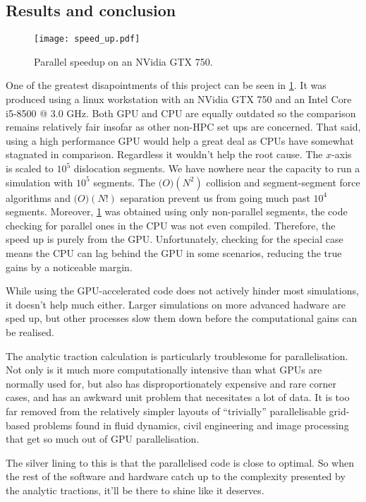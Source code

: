 \subsection{Results and conclusion}

\begin{figure}
    \centering
    \texttt{[image: speed\_up.pdf]}
    \caption[Parallel speedup on an NVidia GTX 750.]{Parallel speedup on an NVidia GTX 750.}
    \label{fig:parallel}
\end{figure}

One of the greatest disapointments of this project can be seen in \cref{fig:parallel}. It was produced using a linux workstation with an NVidia GTX 750 and an Intel Core i5-8500 @ 3.0 GHz. Both GPU and CPU are equally outdated so the comparison remains relatively fair insofar as other non-HPC set ups are concerned. That said, using a high performance GPU would help a great deal as CPUs have somewhat stagnated in comparison. Regardless it wouldn't help the root cause. The $x$-axis is scaled to $10^5$ dislocation segments. We have nowhere near the capacity to run a simulation with $10^5$ segments. The $\mathcal(O)(N^2)$ collision and segment-segment force algorithms and $\mathcal(O)(N!)$ separation prevent us from going much past $10^4$ segments. Moreover, \cref{fig:parallel} was obtained using only non-parallel segments, the code checking for parallel ones in the CPU was not even compiled. Therefore, the speed up is purely from the GPU. Unfortunately, checking for the special case means the CPU can lag behind the GPU in some scenarios, reducing the true gains by a noticeable margin.

While using the GPU-accelerated code does not actively hinder most simulations, it doesn't help much either. Larger simulations on more advanced hadware are sped up, but other processes slow them down before the computational gains can be realised.

The analytic traction calculation is particularly troublesome for parallelisation. Not only is it much more computationally intensive than what GPUs are normally used for, but also has disproportionately expensive and rare corner cases, and has an awkward unit problem that necesitates a lot of data. It is too far removed from the relatively simpler layouts of ``trivially'' parallelisable grid-based problems found in fluid dynamics, civil engineering and image processing that get so much out of GPU parallelisation.

The silver lining to this is that the parallelised code is close to optimal. So when the rest of the software and hardware catch up to the complexity presented by the analytic tractions, it'll be there to shine like it deserves.
\savearabiccounter
